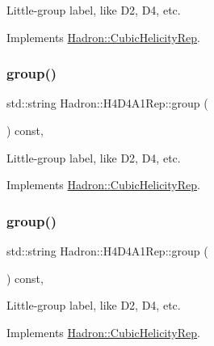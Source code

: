 Little-\/group label, like D2, D4, etc. 

Implements \mbox{\hyperlink{structHadron_1_1CubicHelicityRep_a101a7d76cd8ccdad0f272db44b766113}{Hadron\+::\+Cubic\+Helicity\+Rep}}.

\mbox{\label{structHadron_1_1H4D4A1Rep_a3402ac90043c637d96eeafff046ba3ed}} 
\subsubsection{\texorpdfstring{group()}{group()}\hspace{0.1cm}{\footnotesize\ttfamily [3/5]}}
{\footnotesize\ttfamily std\+::string Hadron\+::\+H4\+D4\+A1\+Rep\+::group (\begin{DoxyParamCaption}{ }\end{DoxyParamCaption}) const\hspace{0.3cm}{\ttfamily [inline]}, {\ttfamily [virtual]}}

Little-\/group label, like D2, D4, etc. 

Implements \mbox{\hyperlink{structHadron_1_1CubicHelicityRep_a101a7d76cd8ccdad0f272db44b766113}{Hadron\+::\+Cubic\+Helicity\+Rep}}.

\mbox{\label{structHadron_1_1H4D4A1Rep_a3402ac90043c637d96eeafff046ba3ed}} 
\subsubsection{\texorpdfstring{group()}{group()}\hspace{0.1cm}{\footnotesize\ttfamily [4/5]}}
{\footnotesize\ttfamily std\+::string Hadron\+::\+H4\+D4\+A1\+Rep\+::group (\begin{DoxyParamCaption}{ }\end{DoxyParamCaption}) const\hspace{0.3cm}{\ttfamily [inline]}, {\ttfamily [virtual]}}

Little-\/group label, like D2, D4, etc. 

Implements \mbox{\hyperlink{structHadron_1_1CubicHelicityRep_a101a7d76cd8ccdad0f272db44b766113}{Hadron\+::\+Cubic\+Helicity\+Rep}}.

\mbox{\label{structHadron_1_1H4D4A1Rep_a3402ac90043c637d96eeafff046ba3ed}} 
